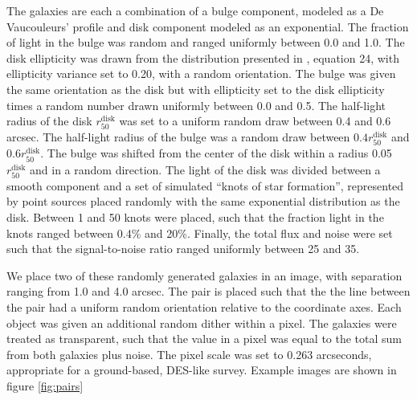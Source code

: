\documentclass[fleqn,useAMS,usenatbib]{mnras}
\begin{document}
The galaxies are each a combination of a bulge component, modeled as a
De Vaucouleurs' profile \citep{devauc1948} and disk component modeled as
an exponential. The fraction of light in the bulge was random and ranged
uniformly between 0.0 and 1.0. The disk ellipticity was drawn from the
distribution presented in \cite{ba14}, equation 24, with ellipticity variance
set to 0.20, with a random orientation. The bulge was given the same orientation
as the disk but with ellipticity set to the disk ellipticity times a random
number drawn uniformly between 0.0 and 0.5. The half-light radius of the disk
$r_{50}^{\mathrm{disk}}$ was set to a uniform random draw between 0.4 and 0.6
arcsec. The half-light radius of the bulge was a random draw between $0.4 r_{50}^{\mathrm{disk}}$
and $0.6 r_{50}^{\mathrm{disk}}$. The bulge was shifted from the center of the
disk within a radius 0.05$r_{50}^{\mathrm{disk}}$ and in a random direction.
The light of the disk was divided between a smooth component and a set of
simulated ``knots of star formation'', represented by point sources placed
randomly with the same exponential distribution as the disk.  Between 1 and 50
knots were placed, such that the fraction light in the knots ranged between
0.4\% and 20\%. Finally, the total flux and noise were set such that the
signal-to-noise ratio ranged uniformly between 25 and 35.

We place two of these randomly generated galaxies in an image, with
separation ranging from 1.0 and 4.0 arcsec. The pair is placed such that the
the line between the pair had a uniform random orientation relative to the
coordinate axes. Each object was given an additional random dither within a
pixel. The galaxies were treated as transparent, such that the value in a
pixel was equal to the total sum from both galaxies plus noise. The pixel scale
was set to 0.263 arcseconds, appropriate for a ground-based, DES-like survey.
Example images are shown in figure \ref{fig:pairs}
\end{document}
